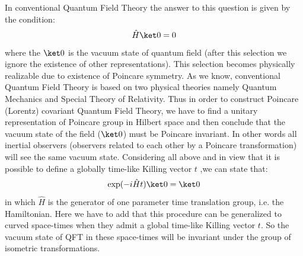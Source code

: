 \documentclass[12pt,a4paper]{article}
\begin{document}
 In conventional Quantum Field Theory the answer to this question is given by the condition:
 \begin{equation}\label{eqn.vacuum1}
   \hat{H}\ket0=0
 \end{equation}
 where the $\ket0$ is the vacuum state of quantum field (after this selection we ignore the existence of other representations). This selection becomes physically realizable due to existence of Poincare symmetry. As we know, conventional Quantum Field Theory is based on two physical theories namely Quantum Mechanics and Special Theory of Relativity. Thus in order to construct Poincare (Lorentz) covariant Quantum Field Theory, we have to find a unitary representation of Poincare group in Hilbert space and then conclude that the vacuum state of the field ($\ket0$) must be Poincare invariant. In other words all inertial observers (observers related to each other by a Poincare transformation) will see the same vacuum state.
Considering all above and in view that it is possible to define a globally time-like Killing vector $t$ ,we can state that:
\begin{equation}
      \exp (-i\hat{H}t)\ket0=\ket0
\end{equation}
in which $\hat{H}$ is the generator of one parameter time translation group, i.e. the Hamiltonian. 
Here we have to add that this procedure can be generalized to curved space-times when they admit a global time-like Killing vector $t$. So the vacuum state of QFT in these space-times will be invariant under the group of isometric transformations.
\end{document}
